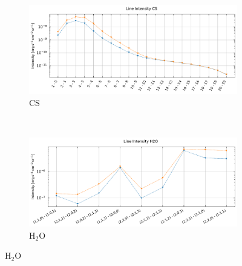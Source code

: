 \begin{figure}[!h]
    \centering
    \begin{subfigure}[t]{0.49\textwidth} %
        \centering \includegraphics[trim = {0 0 0 1cm},clip,width=1\textwidth]{figure/Cl/gridModelEmiss/I_comp_CS.pdf}
        \caption{$\mathrm{CS}$}
    \end{subfigure}
    ~ 
   \begin{subfigure}[t]{0.49\textwidth} %
        \centering \includegraphics[trim = {0 0 0 1cm},clip,width=1\textwidth]{figure/Cl/gridModelEmiss/I_comp_H2O.pdf}
        \caption{$\mathrm{H}_2\mathrm{O}$}
    \end{subfigure}
    

\end{figure}
